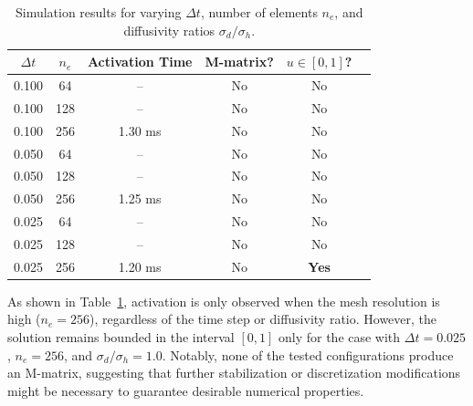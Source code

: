 \documentclass[12pt,a4paper]{article}
\begin{document}
\begin{table}[H]
\centering
\begin{tabular}{cccccc}
    \toprule
    $\Delta t$ & $n_e$ & Activation Time & M-matrix? & $u \in [0,1]$? \\
    \midrule
    0.100 & 64  & --     & No  & No \\
    0.100 & 128  & --     & No  & No \\
    0.100 & 256 & 1.30 ms & No & No \\
    0.050 & 64  & --     & No  & No \\
    0.050 & 128  & --     & No  & No \\
    0.050 & 256  & 1.25 ms & No & No \\
    0.025 & 64  & --     & No  & No \\
    0.025 & 128  & --     & No  & No \\
    0.025 & 256  & 1.20 ms & No & \textbf{Yes} \\
    \bottomrule
\end{tabular}
\caption{Simulation results for varying $\Delta t$, number of elements $n_e$, and diffusivity ratios $\sigma_d / \sigma_h$.}
\label{tab:simulation_results}
\end{table}
As shown in Table~\ref{tab:simulation_results}, activation is only observed when the mesh resolution is high ($n_e = 256$), regardless of the time step or diffusivity ratio. However, the solution remains bounded in the interval $[0,1]$ only for the case with $\Delta t = 0.025$, $n_e = 256$, and $\sigma_d/\sigma_h = 1.0$. Notably, none of the tested configurations produce an M-matrix, suggesting that further stabilization or discretization modifications might be necessary to guarantee desirable numerical properties.
\end{document}
